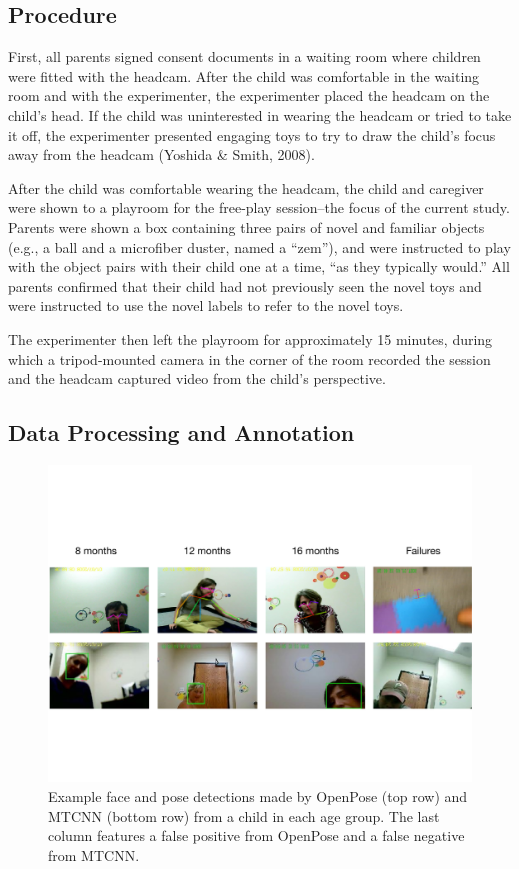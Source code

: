 \documentclass[10pt, letterpaper]{article}
\begin{document}
\subsection{Procedure}\label{procedure}

First, all parents signed consent documents in a waiting room where
children were fitted with the headcam. After the child was comfortable
in the waiting room and with the experimenter, the experimenter placed
the headcam on the child's head. If the child was uninterested in
wearing the headcam or tried to take it off, the experimenter presented
engaging toys to try to draw the child's focus away from the headcam
(Yoshida \& Smith, 2008).

After the child was comfortable wearing the headcam, the child and
caregiver were shown to a playroom for the free-play session--the focus
of the current study. Parents were shown a box containing three pairs of
novel and familiar objects (e.g., a ball and a microfiber duster, named
a ``zem''), and were instructed to play with the object pairs with their
child one at a time, ``as they typically would.'' All parents confirmed
that their child had not previously seen the novel toys and were
instructed to use the novel labels to refer to the novel toys.

The experimenter then left the playroom for approximately 15 minutes,
during which a tripod-mounted camera in the corner of the room recorded
the session and the headcam captured video from the child's perspective.

\subsection{Data Processing and
Annotation}\label{data-processing-and-annotation}

\begin{figure}
\includegraphics[width=6in]{images/detector_samples_banner.pdf}
\caption{\label{fig:frames} Example face and pose detections made by OpenPose (top row) and MTCNN (bottom row) from a child in each age group. The last column features a false positive from OpenPose and a false negative from MTCNN.}
\end{figure}
\end{document}
